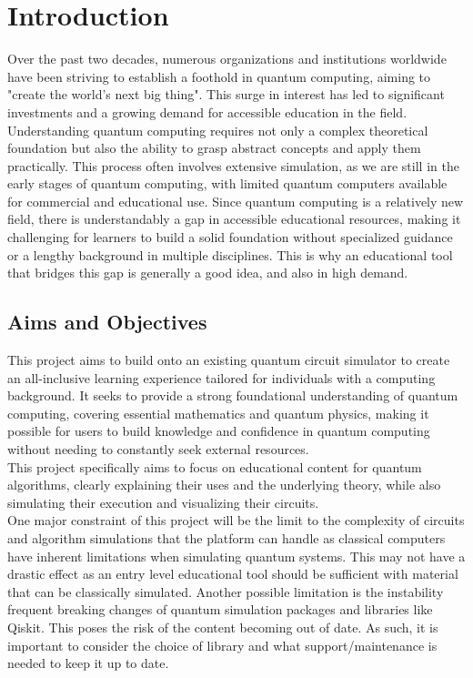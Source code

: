 \chapter{Introduction}

Over the past two decades, numerous organizations and institutions worldwide have been striving to establish a foothold in quantum computing, aiming to "create the world's next big thing"\cite{Reference1}. This surge in interest has led to significant investments and a growing demand for accessible education in the field. \\
\newline
Understanding quantum computing requires not only a complex theoretical foundation but also the ability to grasp abstract concepts and apply them practically. This process often involves extensive simulation, as we are still in the early stages of quantum computing, with limited quantum computers available for commercial and educational use. Since quantum computing is a relatively new field, there is understandably a gap in accessible educational resources, making it challenging for learners to build a solid foundation without specialized guidance or a lengthy background in multiple disciplines. This is why an educational tool that bridges this gap is generally a good idea, and also in high demand. 

\section{Aims and Objectives}

This project aims to build onto an existing quantum circuit simulator to create an all-inclusive learning experience tailored for individuals with a computing background. It seeks to provide a strong foundational understanding of quantum computing, covering essential mathematics and quantum physics, making it possible for users to build knowledge and confidence in quantum computing without needing to constantly seek external resources. \\


This project specifically aims to focus on educational content for quantum algorithms, clearly explaining their uses and the underlying theory, while also simulating their execution and visualizing their circuits.\\


One major constraint of this project will be the limit to the complexity of circuits and algorithm simulations that the platform can handle as classical computers have inherent limitations when simulating quantum systems. This may not have a drastic effect as an entry level educational tool should be sufficient with material that can be classically simulated. Another possible limitation is the instability frequent breaking changes of quantum simulation packages and libraries like Qiskit. This poses the risk of the content becoming out of date. As such, it is important to consider the choice of library and what support/maintenance is needed to keep it up to date.





